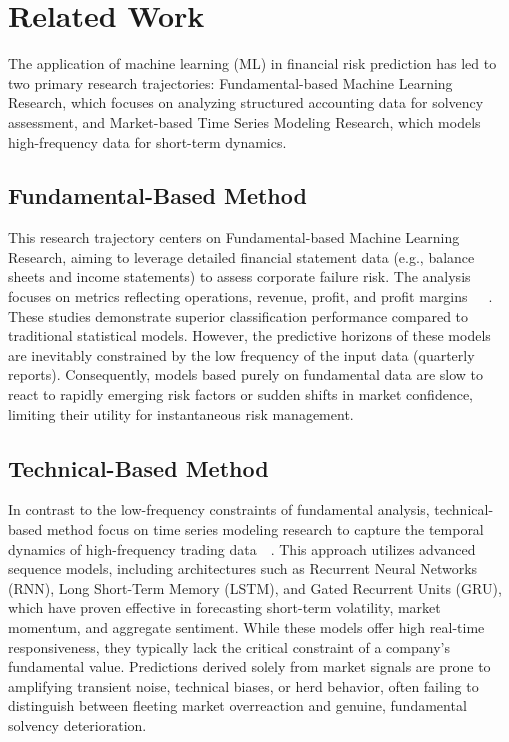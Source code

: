 \section{Related Work}
\label{sec:related work}
The application of machine learning (ML) in financial risk prediction has led to two primary research trajectories: Fundamental-based Machine Learning Research, which focuses on analyzing structured accounting data for solvency assessment, and Market-based Time Series Modeling Research, which models high-frequency data for short-term dynamics.

\subsection{Fundamental-Based Method}
This research trajectory centers on Fundamental-based Machine Learning Research, aiming to leverage detailed financial statement data (e.g., balance sheets and income statements) to assess corporate failure risk. The analysis focuses on metrics reflecting operations, revenue, profit, and profit margins~\cite{gu2020empirical}~\cite{ahbali2022identifying}~\cite{wang2023sparsity}. These studies demonstrate superior classification performance compared to traditional statistical models. However, the predictive horizons of these models are inevitably constrained by the low frequency of the input data (quarterly reports). Consequently, models based purely on fundamental data are slow to react to rapidly emerging risk factors or sudden shifts in market confidence, limiting their utility for instantaneous risk management.

\subsection{Technical-Based Method}
In contrast to the low-frequency constraints of fundamental analysis, technical-based method focus on time series modeling research to capture the temporal dynamics of high-frequency trading data~\cite{random_forest}~\cite{svm}. This approach utilizes advanced sequence models, including architectures such as Recurrent Neural Networks (RNN), Long Short-Term Memory (LSTM), and Gated Recurrent Units (GRU), which have proven effective in forecasting short-term volatility, market momentum, and aggregate sentiment. While these models offer high real-time responsiveness, they typically lack the critical constraint of a company's fundamental value. Predictions derived solely from market signals are prone to amplifying transient noise, technical biases, or herd behavior, often failing to distinguish between fleeting market overreaction and genuine, fundamental solvency deterioration.

